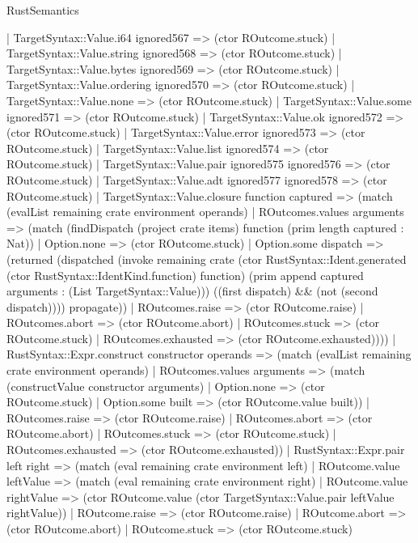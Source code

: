 \begin{lexlean}{RustSemantics}
\begin{semanticmodule}
{          | TargetSyntax::Value.i64 ignored567 => (ctor ROutcome.stuck)
          | TargetSyntax::Value.string ignored568 => (ctor ROutcome.stuck)
          | TargetSyntax::Value.bytes ignored569 => (ctor ROutcome.stuck)
          | TargetSyntax::Value.ordering ignored570 => (ctor ROutcome.stuck)
          | TargetSyntax::Value.none => (ctor ROutcome.stuck)
          | TargetSyntax::Value.some ignored571 => (ctor ROutcome.stuck)
          | TargetSyntax::Value.ok ignored572 => (ctor ROutcome.stuck)
          | TargetSyntax::Value.error ignored573 => (ctor ROutcome.stuck)
          | TargetSyntax::Value.list ignored574 => (ctor ROutcome.stuck)
          | TargetSyntax::Value.pair ignored575 ignored576 => (ctor ROutcome.stuck)
          | TargetSyntax::Value.adt ignored577 ignored578 => (ctor ROutcome.stuck)
          | TargetSyntax::Value.closure function captured => (match (evalList remaining crate environment operands)
            | ROutcomes.values arguments => (match (findDispatch (project crate items) function (prim length captured : Nat))
              | Option.none => (ctor ROutcome.stuck)
              | Option.some dispatch => (returned (dispatched (invoke remaining crate (ctor RustSyntax::Ident.generated (ctor RustSyntax::IdentKind.function) function) (prim append captured arguments : (List TargetSyntax::Value))) ((first dispatch) && (not (second dispatch)))) propagate))
            | ROutcomes.raise => (ctor ROutcome.raise)
            | ROutcomes.abort => (ctor ROutcome.abort)
            | ROutcomes.stuck => (ctor ROutcome.stuck)
            | ROutcomes.exhausted => (ctor ROutcome.exhausted))))
      | RustSyntax::Expr.construct constructor operands => (match (evalList remaining crate environment operands)
        | ROutcomes.values arguments => (match (constructValue constructor arguments)
          | Option.none => (ctor ROutcome.stuck)
          | Option.some built => (ctor ROutcome.value built))
        | ROutcomes.raise => (ctor ROutcome.raise)
        | ROutcomes.abort => (ctor ROutcome.abort)
        | ROutcomes.stuck => (ctor ROutcome.stuck)
        | ROutcomes.exhausted => (ctor ROutcome.exhausted))
      | RustSyntax::Expr.pair left right => (match (eval remaining crate environment left)
        | ROutcome.value leftValue => (match (eval remaining crate environment right)
          | ROutcome.value rightValue => (ctor ROutcome.value (ctor TargetSyntax::Value.pair leftValue rightValue))
          | ROutcome.raise => (ctor ROutcome.raise)
          | ROutcome.abort => (ctor ROutcome.abort)
          | ROutcome.stuck => (ctor ROutcome.stuck)
}
\end{semanticmodule}
\end{lexlean}
